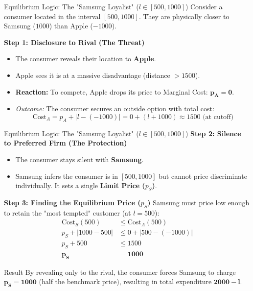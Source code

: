 \documentclass{beamer}
\begin{document}
\begin{frame}{Equilibrium Logic: The "Samsung Loyalist" ($l \in [500, 1000]$)}\label{Bertrand}
    Consider a consumer located in the interval $[500, 1000]$. They are physically closer to Samsung ($1000$) than Apple ($-1000$).

    \vspace{0.2cm}

    \textbf{Step 1: Disclosure to Rival (The Threat)}
    \begin{itemize}
        \item The consumer reveals their location to \textbf{Apple}.
        \item Apple sees it is at a massive disadvantage (distance $>1500$).
        \item \textbf{Reaction:} To compete, Apple drops its price to Marginal Cost: $\mathbf{p_A = 0}$.
        \item \textit{Outcome:} The consumer secures an outside option with total cost:
        \[ \text{Cost}_A = p_A + |l - (-1000)| = 0 + (l + 1000) \approx 1500 \text{ (at cutoff)} \]
    \end{itemize}

\end{frame}

\begin{frame}{Equilibrium Logic: The "Samsung Loyalist" ($l \in [500, 1000]$)}
     \textbf{Step 2: Silence to Preferred Firm (The Protection)}
    \begin{itemize}
        \item The consumer stays silent with \textbf{Samsung}.
        \item Samsung infers the consumer is in $[500, 1000]$ but cannot price discriminate individually. It sets a single \textbf{Limit Price ($p_S$)}.
    \end{itemize}

    \textbf{Step 3: Finding the Equilibrium Price ($p_S$)}
    Samsung must price low enough to retain the "most tempted" customer (at $l=500$):
    \begin{align*}
        \text{Cost}_S(500) &\le \text{Cost}_A(500) \\
        p_S + |1000 - 500| &\le 0 + |500 - (-1000)| \\
        p_S + 500 &\le 1500 \\
        \mathbf{p_S} &= \mathbf{1000}
    \end{align*}

    \begin{block}{Result}
        By revealing only to the rival, the consumer forces Samsung to charge $\mathbf{p_S = 1000}$ (half the benchmark price), resulting in total expenditure $\mathbf{2000 - l}$.
    \end{block}
\end{frame}
\end{document}
